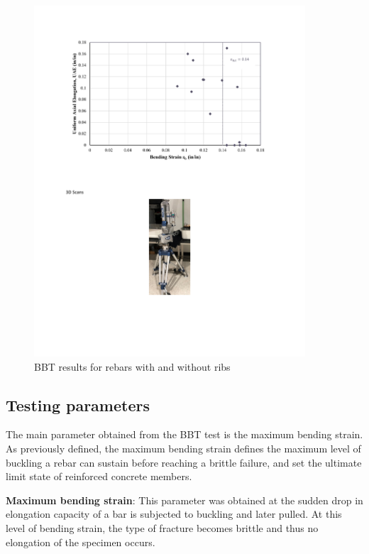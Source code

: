 \begin{figure}[htbp]
    \centering
    \includegraphics[width=0.9\textwidth]{VAC Thesis 2.0/Chapter-3/figs/bbt_bendinstrain_cl0.pdf}
    \caption{BBT results for rebars with and without ribs \cite{Barcley2018}}
    \label{fig:BBT_MaxBendingStrain}
\end{figure}

\newpage

\subsection{Testing parameters}

The main parameter obtained from the BBT test is the maximum bending strain. As previously defined, the maximum bending strain defines the maximum level of buckling a rebar can sustain before reaching a brittle failure, and set the ultimate limit state of reinforced concrete members.

\textbf{Maximum bending strain}: This parameter was obtained at the sudden drop in elongation capacity of a bar is subjected to buckling and later pulled. At  this level of bending strain, the type of fracture becomes brittle and thus no elongation of the specimen occurs.


